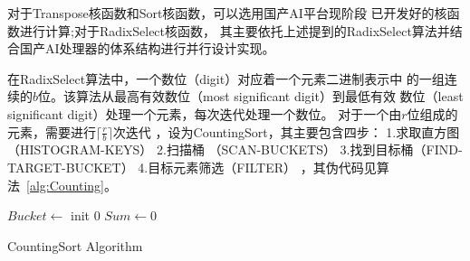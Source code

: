 对于Transpose核函数和Sort核函数，可以选用国产AI平台现阶段
已开发好的核函数进行计算;对于RadixSelect核函数，
其主要依托上述提到的RadixSelect算法并结合国产AI处理器的体系结构进行并行设计实现。

在RadixSelect算法中，一个数位（digit）对应着一个元素二进制表示中
的一组连续的\(b\)位。该算法从最高有效数位（most significant digit）到最低有效
数位（least significant digit）处理一个元素，每次迭代处理一个数位。
对于一个由\(r\)位组成的元素，需要进行\(\lceil\frac{r}{b}\rceil\)次迭代
，设为CountingSort，其主要包含四步：
1.求取直方图（HISTOGRAM-KEYS） 
2.扫描桶 （SCAN-BUCKETS） 
3.找到目标桶（FIND-TARGET-BUCKET） 
4.目标元素筛选（FILTER）
，其伪代码见算法~\ref{alg:Counting}。

\begin{algorithm}
    \SetAlgoNoLine 
    $Bucket \leftarrow$ init $0$ 
    $Sum \leftarrow 0$\;\\
    \caption{CountingSort Algorithm}
\end{algorithm}


